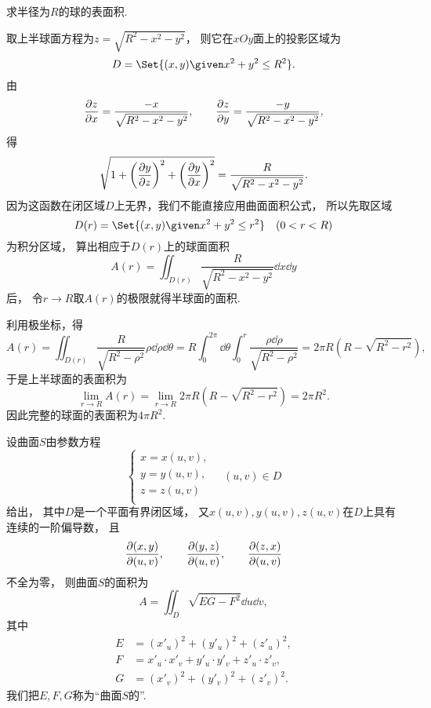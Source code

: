 \begin{example}
求半径为\(R\)的球的表面积.
\begin{solution}
取上半球面方程为\(z = \sqrt{R^2-x^2-y^2}\)，
则它在\(xOy\)面上的投影区域为\[
	D = \Set{(x,y) \given x^2+y^2 \leq R^2}.
\]
由\[
	\pdv{z}{x} = \frac{-x}{\sqrt{R^2-x^2-y^2}},
	\qquad
	\pdv{z}{y} = \frac{-y}{\sqrt{R^2-x^2-y^2}},
\]
得\[
	\sqrt{1 + \left(\pdv{y}{z}\right)^2 + \left(\pdv{y}{x}\right)^2}
	= \frac{R}{\sqrt{R^2-x^2-y^2}}.
\]
因为这函数在闭区域\(D\)上无界，我们不能直接应用曲面面积公式，
所以先取区域\[
	D(r) = \Set{(x,y) \given x^2+y^2 \leq r^2}
	\quad(0<r<R)
\]为积分区域，
算出相应于\(D(r)\)上的球面面积\[
	A(r) = \iint_{D(r)} \frac{R}{\sqrt{R^2-x^2-y^2}} \dd{x}\dd{y}
\]后，
令\(r \to R\)取\(A(r)\)的极限就得半球面的面积.

利用极坐标，得\[
	A(r) = \iint_{D(r)} \frac{R}{\sqrt{R^2-\rho^2}} \rho\dd{\rho}\dd{\theta}
	= R \int_0^{2\pi} \dd{\theta} \int_0^r \frac{\rho \dd{\rho}}{\sqrt{R^2-\rho^2}}
	= 2\pi R(R-\sqrt{R^2-r^2}),
\]
于是上半球面的表面积为\[
	\lim_{r \to R} A(r)
	= \lim_{r \to R} 2\pi R(R-\sqrt{R^2-r^2})
	= 2\pi R^2.
\]
因此完整的球面的表面积为\(4\pi R^2\).
\end{solution}
\end{example}

\begin{theorem}[利用曲面的参数方程求曲面的面积]
设曲面\(S\)由参数方程\[
	\left\{ \begin{array}{l}
		x = x(u,v), \\
		y = y(u,v), \\
		z = z(u,v) \\
	\end{array} \right.
	\quad
	(u,v) \in D
\]给出，
其中\(D\)是一个平面有界闭区域，
又\(x(u,v), y(u,v), z(u,v)\)在\(D\)上具有连续的一阶偏导数，
且\[
	\pdv{ (x,y) }{ (u,v) }, \qquad
	\pdv{ (y,z) }{ (u,v) }, \qquad
	\pdv{ (z,x) }{ (u,v) }
\]不全为零，
则曲面\(S\)的面积为
\begin{equation}\label{equation:重积分.曲面的面积计算公式}
	A = \iint_D \sqrt{E G - F^2} \dd{u}\dd{v},
\end{equation}
其中\begin{align*}
	E &= (x'_u)^2 + (y'_u)^2 + (z'_u)^2, \\
	F &= x'_u \cdot x'_v + y'_u \cdot y'_v + z'_u \cdot z'_v, \\
	G &= (x'_v)^2 + (y'_v)^2 + (z'_v)^2.
\end{align*}
\rm
我们把\(E,F,G\)称为“曲面\(S\)的”.
\end{theorem}

